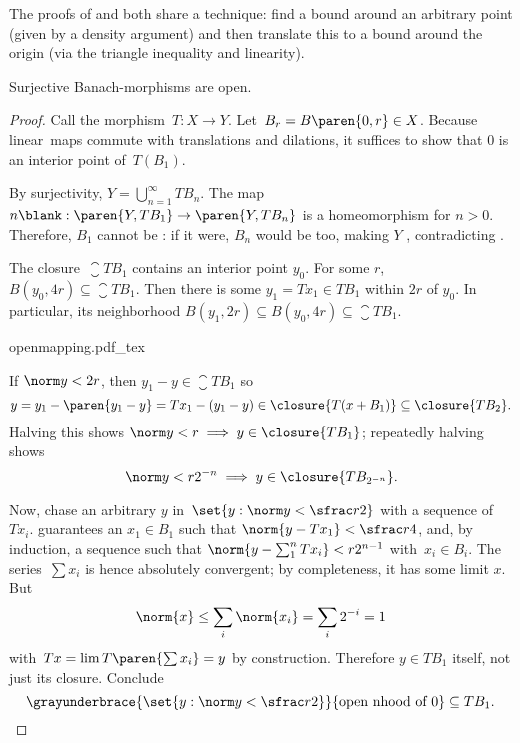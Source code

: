 \documentclass{scrartcl}
\newcommand{\ball}{B}
\begin{document}
The proofs of  and  both share a technique: find a bound around an arbitrary point (given by a density argument) and then translate this to a bound around the origin (via the triangle inequality and linearity).
\begin{theorem}\label{open mapping theorem}
  Surjective Banach-morphisms are open.
\end{theorem}
\begin{proof}
  Call the morphism~\(T:X\to Y\). Let~\(\ball_r=\ball\paren{0,r}\in X\). Because linear~maps commute with translations and dilations, it suffices to show that \(0\) is an interior point of~\(T(B_1)\).

  By surjectivity,
  \(Y = \bigcup_{n=1}^\infty TB_n\). The map \(n\blank: \paren{Y,TB_1}\to \paren{Y,TB_n}\) is a homeomorphism for \(n>0\). Therefore, \(B_1\) cannot be : if it were, \(\ball_n\) would be too, making \(Y\) , contradicting .

  The closure~\(\closure{T\ball_1}\) contains an interior point \(y_0\). For some \(r\), \(\ball(y_0,4r)\subseteq \closure{T\ball_1}\). Then there is some \(y_1=Tx_1\in T\ball_1\) within \(2r\) of \(y_0\). In particular, its neighborhood \(\ball(y_1,2r)\subseteq \ball(y_0,4r)\subseteq \closure{T\ball_1}\).
  \begin{center}
    {openmapping.pdf_tex}
  \end{center}
  If \(\norm y < 2r\), then \(y_1-y\in \closure{T\ball_1}\) so \[y=y_1-\paren{y_1-y} = Tx_1 - (y_1-y)\in \closure{T(x+\ball_1)}\subseteq \closure{T\ball_2}.\] Halving this shows \(\norm y < r \implies y\in \closure{T\ball_1}\); repeatedly halving shows
  \begin{equation}
    \norm y < r2^{-n} \implies y\in \closure{T\ball_{2^{-n}}}.\label{eq:openmap-small enough to be in closed image}
  \end{equation}

Now, chase an arbitrary \(y\) in~\(\set{y:\norm y < \sfrac r 2}\) with a sequence of~\(Tx_i\).  guarantees an \(x_1\in \ball_1\) such that \(\norm{y-Tx_1} < \sfrac r 4\), and, by induction, a sequence such that \(\norm{y-\sum_1^n Tx_i} < r2^{n-1}\) with~\(x_i\in\ball_i\). The series~\(\sum x_i\) is hence absolutely convergent; by completeness, it has some limit \(x\). But
\[
  \norm{x} \leq \sum_i \norm{x_i} = \sum_i 2^{-i} = 1
\]
with~\(Tx=\lim T\paren{\sum x_i}=y\) by construction. Therefore \(y\in T\ball_1\) itself, not just its closure. Conclude
\[
  \grayunderbrace{\set{y: \norm y < \sfrac r 2}}{\text{open nhood of } 0} \subseteq T\ball_1.
\]
\end{proof}
\end{document}
